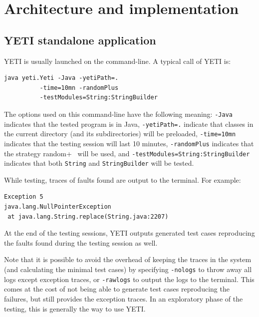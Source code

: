 \section{Architecture and implementation}\label{sec:architecture}

\subsection{YETI standalone application}
YETI is usually launched on the command-line. A typical call of YETI is:
{\small
\begin{verbatim}
java yeti.Yeti -Java -yetiPath=. 
          -time=10mn -randomPlus
          -testModules=String:StringBuilder 
\end{verbatim}
}

The options used on this command-line have the following meaning: \texttt{-Java} 
indicates that the tested program is in Java, \texttt{-yetiPath=.} indicate that 
classes in the current directory (and its subdirectories) will be preloaded, 
\texttt{-time=10mn} indicates that the testing session will last 10 minutes, 
\texttt{-randomPlus} indicates that the strategy random+~\cite{CMOP:08:FFMTRTUR} will be used, and 
\texttt{-testModules=String:StringBuilder} indicates that 
both \texttt{String} and \texttt{StringBuilder} will be tested.

While testing, traces of faults found are output to the terminal. For example:

{\small
\begin{verbatim}
Exception 5
java.lang.NullPointerException
 at java.lang.String.replace(String.java:2207)
\end{verbatim}
}

At the end of the testing sessions, YETI outputs generated test cases reproducing 
the faults found during the testing session as well.

Note that it is possible to avoid the overhead of keeping the 
traces in the system (and calculating the minimal test cases) by specifying 
\texttt{-nologs} to throw away all logs except exception traces, or 
\texttt{-rawlogs} to output the logs to the terminal. This comes at the cost of
not being able to generate test cases reproducing the failures, but still provides 
the exception traces. In an exploratory phase of the testing, this is generally the
way to use YETI.


